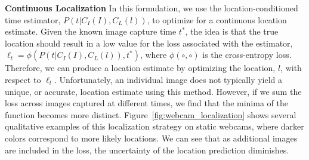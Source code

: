 \documentclass{bmvc2k}
\newcommand{\figref}[1]{Figure~\ref{fig:#1}}
\begin{document}
\noindent \textbf{Continuous Localization} In this formulation, we use
the location-conditioned time estimator, $P(t|C_I(I),C_L(l))$, to
optimize for a continuous location estimate.  Given the known image
capture time $t^*$, the idea is that the true location should result
in a low value for the loss associated with the estimator, $\ell_t =
\phi(P(t|C_I(I),C_L(l)), t^*)$, where $\phi(\circ,\circ)$ is the
cross-entropy loss. Therefore, we can produce a location estimate by
optimizing the location, $l$, with respect to $\ell_t$. Unfortunately,
an individual image does not typically yield a unique, or accurate,
location estimate using this method. However, if we sum the loss
across images captured at different times, we find that the minima of
the function becomes more distinct. \figref{webcam_localization} shows
several qualitative examples of this localization strategy on static
webcams, where darker colors correspond to more likely locations. We
can see that as additional images are included in the loss, the
uncertainty of the location prediction diminishes.
\end{document}
